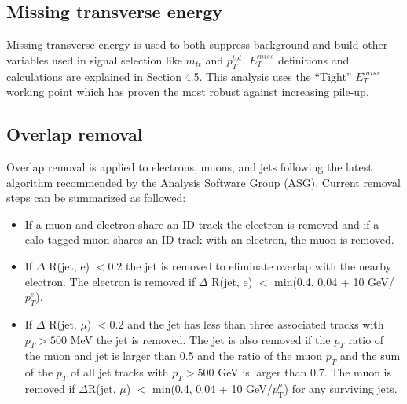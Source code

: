 \subsection{Missing transverse energy}

Missing transverse energy is used to both suppress background and build other variables used in signal selection like $m_{tt}$ and $p_T^{tot}$. $E_T^{miss}$ definitions and calculations are explained in Section 4.5. This analysis uses the ``Tight'' $E_T^{miss}$ working point which has proven the most robust against increasing pile-up.

\subsection{Overlap removal}
Overlap removal is applied to electrons, muons, and jets following the latest algorithm recommended by the Analysis Software Group (ASG). Current removal steps can be summarized as followed:
\begin{itemize}
\item If a muon and electron share an ID track the electron is removed and if a calo-tagged muon shares an ID track with an electron, the muon is removed.
\item If $\Delta$ R(jet, e) $< 0.2$ the jet is removed to eliminate overlap with the nearby electron. The electron is removed if $\Delta$ R(jet, e) $<$ min(0.4, 0.04 + 10 GeV/$p_T^e$).
\item If $\Delta$ R(jet, $\mu$) $< 0.2$ and the jet has less than three associated tracks with $p_T>500$ MeV the jet is removed. The jet is also removed if the $p_T$ ratio of the muon and jet is larger than 0.5 and the ratio of the muon $p_T$ and the sum of the $p_T$ of all jet tracks with $p_T>500$ GeV is larger than 0.7. The muon is removed if $\Delta$R(jet, $\mu$) $<$ min(0.4, 0.04 + 10 GeV/$p_\mathrm{{T}}^{\mu}$) for any surviving jets.
\end{itemize}


